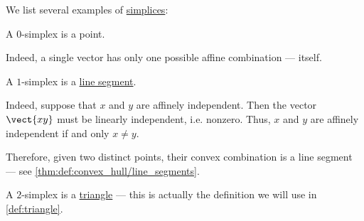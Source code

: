 \begin{definition}\label{def:standard_simplex}\mimprovised
\end{definition}

\begin{remark}\label{def:simplex_terminology}
\end{remark}

\begin{example}\label{ex:def:simplex}
  We list several examples of \hyperref[def:simplex]{simplices}:
  \begin{thmenum}
     A \( 0 \)-simplex is a point.

    Indeed, a single vector has only one possible affine combination --- itself.

     A \( 1 \)-simplex is a \hyperref[def:line_segment]{line segment}.

    Indeed, suppose that \( x \) and \( y \) are affinely independent. Then the vector \( \vect{xy} \) must be linearly independent, i.e. nonzero. Thus, \( x \) and \( y \) are affinely independent if and only \( x \neq y \).

    Therefore, given two distinct points, their convex combination is a line segment --- see \cref{thm:def:convex_hull/line_segments}.

     A \( 2 \)-simplex is a \hyperref[def:triangle]{triangle} --- this is actually the definition we will use in \cref{def:triangle}.
  \end{thmenum}
\end{example}

